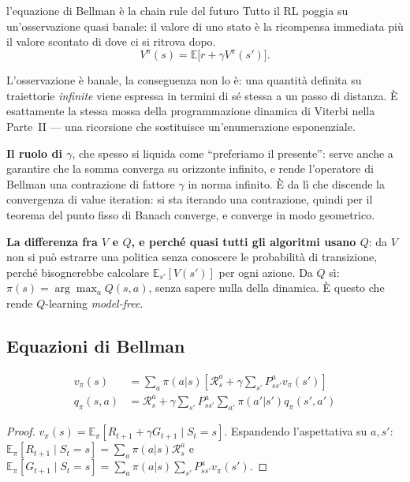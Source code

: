 \begin{intuizione}{l'equazione di Bellman è la chain rule del futuro}
Tutto il RL poggia su un'osservazione quasi banale: il valore di uno stato è la ricompensa immediata più il valore scontato di dove ci si ritrova dopo.
\[
V^\pi(s) = \mathbb{E}\big[r + \gamma V^\pi(s')\big].
\]

L'osservazione è banale, la conseguenza non lo è: una quantità definita su traiettorie \emph{infinite} viene espressa in termini di sé stessa a un passo di distanza. È esattamente la stessa mossa della programmazione dinamica di Viterbi nella Parte~II — una ricorsione che sostituisce un'enumerazione esponenziale.

\textbf{Il ruolo di $\gamma$}, che spesso si liquida come ``preferiamo il presente'': serve anche a garantire che la somma converga su orizzonte infinito, e rende l'operatore di Bellman una contrazione di fattore $\gamma$ in norma infinito. È da lì che discende la convergenza di value iteration: si sta iterando una contrazione, quindi per il teorema del punto fisso di Banach converge, e converge in modo geometrico.

\textbf{La differenza fra $V$ e $Q$, e perché quasi tutti gli algoritmi usano $Q$}: da $V$ non si può estrarre una politica senza conoscere le probabilità di transizione, perché bisognerebbe calcolare $\mathbb{E}_{s'}[V(s')]$ per ogni azione. Da $Q$ sì: $\pi(s) = \arg\max_a Q(s,a)$, senza sapere nulla della dinamica. È questo che rende $Q$-learning \emph{model-free}.
\end{intuizione}

\subsection{Equazioni di Bellman}

\begin{theorem}
\begin{align}
v_\pi(s) &= \sum_{a} \pi(a|s)\!\left[\mathcal{R}^a_s + \gamma \sum_{s'} P^a_{ss'} v_\pi(s')\right] \label{eq:bellman-v}\\
q_\pi(s,a) &= \mathcal{R}^a_s + \gamma \sum_{s'} P^a_{ss'} \sum_{a'} \pi(a'|s') q_\pi(s', a') \label{eq:bellman-q}
\end{align}
\end{theorem}
\begin{proof}
$v_\pi(s) = \mathbb{E}_\pi[R_{t+1} + \gamma G_{t+1} \mid S_t = s]$. Espandendo l'aspettativa su $a, s'$: $\mathbb{E}_\pi[R_{t+1}\mid S_t=s] = \sum_a \pi(a|s) \mathcal{R}^a_s$ e $\mathbb{E}_\pi[G_{t+1}\mid S_t=s] = \sum_a \pi(a|s)\sum_{s'} P^a_{ss'} v_\pi(s')$.
\end{proof}

